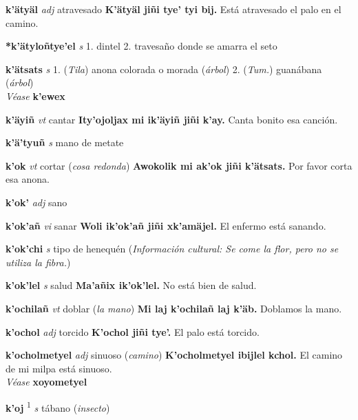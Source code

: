 \documentclass[10pt]{scrbook}
\newcommand{\entry}[1]{\textbf{#1}}
\newcommand{\onedefinition}[1]{#1.}
\newcommand{\defsuperscript}[1]{\textsuperscript{#1}}
\newcommand{\partofspeech}[1]{\textit{#1}}
\newcommand{\spanishtranslation}[1]{#1}
\newcommand{\clarification}[1]{(\textit{#1})}
\newcommand{\cholexample}[1]{\textbf{#1}}
\newcommand{\exampletranslation}[1]{#1}
\newcommand{\alsosee}[1]{\\\textit{Véase} \textbf{#1}}
\newcommand{\relevantdialect}[1]{(\textit{#1})}
\newcommand{\culturalinformation}[1]{(\textit{#1})}
\begin{document}
\begin{multicols}{2}
\entry{k'ätyäl}
\partofspeech{adj}
\spanishtranslation{atravesado}
\cholexample{K'ätyäl jiñi tye' tyi bij.}
\exampletranslation{Está atravesado el palo en el camino.}

\entry{*k'ätyloñtye'el}
\partofspeech{s}
\onedefinition{1}
\spanishtranslation{dintel}
\onedefinition{2}
\spanishtranslation{travesaño donde se amarra el seto}

\entry{k'ätsats}
\partofspeech{s}
\onedefinition{1}
\relevantdialect{Tila}
\spanishtranslation{anona colorada o morada}
\clarification{árbol}
\onedefinition{2}
\relevantdialect{Tum.}
\spanishtranslation{guanábana}
\clarification{árbol}
\alsosee{k'ewex}

\entry{k'äyiñ}
\partofspeech{vt}
\spanishtranslation{cantar}
\cholexample{Ity'ojoljax mi ik'äyiñ jiñi k'ay.}
\exampletranslation{Canta bonito esa canción.}

\entry{k'ä'tyuñ}
\partofspeech{s}
\spanishtranslation{mano de metate}

\entry{k'ok}
\partofspeech{vt}
\spanishtranslation{cortar}
\clarification{cosa redonda}
\cholexample{Awokolik mi ak'ok jiñi k'ätsats.}
\exampletranslation{Por favor corta esa anona.}

\entry{k'ok'}
\partofspeech{adj}
\spanishtranslation{sano}

\entry{k'ok'añ}
\partofspeech{vi}
\spanishtranslation{sanar}
\cholexample{Woli ik'ok'añ jiñi xk'amäjel.}
\exampletranslation{El enfermo está sanando.}

\entry{k'ok'chi}
\partofspeech{s}
\spanishtranslation{tipo de henequén}
\culturalinformation{Información cultural: Se come la flor, pero no se utiliza la fibra.}

\entry{k'ok'lel}
\partofspeech{s}
\spanishtranslation{salud}
\cholexample{Ma'añix ik'ok'lel.}
\exampletranslation{No está bien de salud.}

\entry{k'ochilañ}
\partofspeech{vt}
\spanishtranslation{doblar}
\clarification{la mano}
\cholexample{Mi laj k'ochilañ laj k'äb.}
\exampletranslation{Doblamos la mano.}

\entry{k'ochol}
\partofspeech{adj}
\spanishtranslation{torcido}
\cholexample{K'ochol jiñi tye'.}
\exampletranslation{El palo está torcido.}

\entry{k'ocholmetyel}
\partofspeech{adj}
\spanishtranslation{sinuoso}
\clarification{camino}
\cholexample{K'ocholmetyel ibijlel kchol.}
\exampletranslation{El camino de mi milpa está sinuoso.}
\alsosee{xoyometyel}

\entry{k'oj}
\defsuperscript{1}
\partofspeech{s}
\spanishtranslation{tábano}
\clarification{insecto}


\end{multicols}
\end{document}
